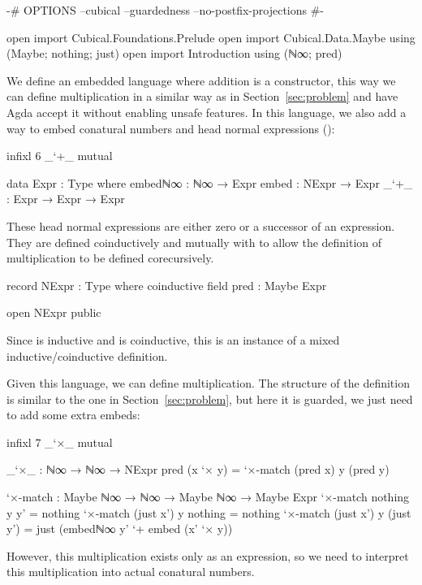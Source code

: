 \begin{code}[hide]
{-# OPTIONS --cubical --guardedness --no-postfix-projections #-}

open import Cubical.Foundations.Prelude
open import Cubical.Data.Maybe using (Maybe; nothing; just)
open import Introduction using (ℕ∞; pred)
\end{code}
We define an embedded language where addition is a constructor, this way we can
define multiplication in a similar way as in Section~\ref{sec:problem} and have
Agda accept it without enabling unsafe features. In this language, we also add a
way to embed conatural numbers and head normal expressions ():
\begin{code}[hide]
infixl 6 _`+_
mutual
\end{code}
\begin{code}
  data Expr : Type where
    embedℕ∞  : ℕ∞ → Expr
    embed    : NExpr → Expr
    _`+_     : Expr → Expr → Expr
\end{code}
These head normal expressions are either zero or a successor of an expression.
They are defined coinductively and mutually with  to allow
the definition of multiplication to be defined corecursively.
\begin{code}
  record NExpr : Type where
    coinductive
    field
      pred : Maybe Expr
\end{code}
\begin{code}[hide]
open NExpr public
\end{code}
Since  is inductive and  is coinductive,
this is an instance of a mixed inductive/coinductive definition.

Given this language, we can define multiplication. The structure of
the definition is similar to the one in Section~\ref{sec:problem}, but here it
is guarded, we just need to add some extra embeds:
\begin{code}[hide]
infixl 7 _`×_
mutual
\end{code}
\begin{code}
  _`×_ : ℕ∞ → ℕ∞ → NExpr
  pred (x `× y) = `×-match (pred x) y (pred y)

  `×-match :
    Maybe ℕ∞ → ℕ∞ → Maybe ℕ∞ → Maybe Expr
  `×-match nothing    y y'         = nothing
  `×-match (just x')  y nothing    = nothing
  `×-match (just x')  y (just y')  =
    just (embedℕ∞ y' `+ embed (x' `× y))
\end{code}
However, this multiplication exists only as an expression, so we need to
interpret this multiplication into actual conatural numbers.

